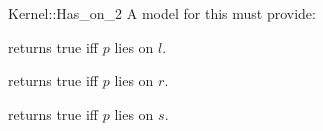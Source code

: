 \begin{ccRefFunctionObjectConcept}{Kernel::Has_on_2}
A model for this must provide:


{returns true iff $p$ lies on $l$.}

{returns true iff $p$ lies on $r$.}

{returns true iff $p$ lies on $s$.}

\end{ccRefFunctionObjectConcept}
